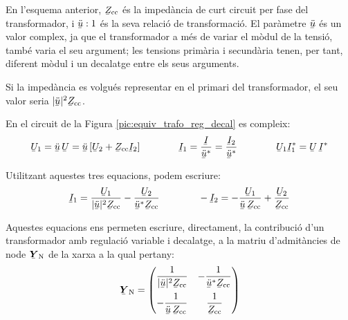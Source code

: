 En l'esquema anterior, $\cmplx{Z}\ped{cc}$ \'{e}s la imped\`{a}ncia de curt
circuit per fase del transformador, i $\cmplx{\ddot{u}} : 1$ \'{e}s la
seva relaci\'{o} de transformaci\'{o}. El par\`{a}metre $\cmplx{\ddot{u}}$ \'{e}s un
valor complex, ja que el transformador a m\'{e}s de variar el m\`{o}dul de
la tensi\'{o}, tamb\'{e} varia  el seu argument; les tensions prim\`{a}ria i
secund\`{a}ria tenen, per tant,  diferent m\`{o}dul i un decalatge entre els
seus arguments.

Si la imped\`{a}ncia es volgu\'{e}s representar en el primari del transformador, el seu valor
seria $|\cmplx{\ddot{u}}|^2 \cmplx{Z}\ped{cc}$.

En el circuit de la Figura \vref{pic:equiv_trafo_reg_decal} es
compleix: 
\begin{equation}
   \cmplx{U}_1 = \cmplx{\ddot{u}} \,\cmplx{U} = \cmplx{\ddot{u}}\,
   [\cmplx{U}_2+\cmplx{Z}\ped{cc}\cmplx{I}_2]
   \qquad\qquad
   \cmplx{I}_1 = \frac{\cmplx{I}}{\cmplx{\ddot{u}}^*} = \frac{\cmplx{I}_2}{\cmplx{\ddot{u}}^*}
   \qquad\qquad
   \cmplx{U}_1 \cmplx{I}_1^* = \cmplx{U} \,\cmplx{I}^*
\end{equation}

Utilitzant aquestes tres equacions, podem escriure:
\begin{equation}
   \cmplx{I}_1 = \frac{\cmplx{U}_1}{|\cmplx{\ddot{u}}|^2 \cmplx{Z}\ped{cc}} - \frac{\cmplx{U}_2}
   {\cmplx{\ddot{u}}^* \cmplx{Z}\ped{cc}} \qquad\qquad
   - \cmplx{I}_2 = - \frac{\cmplx{U}_1}{\cmplx{\ddot{u}} \,\cmplx{Z}\ped{cc}} + \frac{\cmplx{U}_2}
   {\cmplx{Z}\ped{cc}}
\end{equation}

Aquestes equacions ens permeten escriure, directament, la
contribuci\'{o} d'un transformador amb regulaci\'{o} variable i decalatge, a
la matriu d'admit\`{a}ncies de node $\mcmplx{Y}\ped{N}$ de la xarxa a la
qual pertany: 
\begin{equation} \label{eq:yn_trafo_reg_decal}
   \mcmplx{Y}\ped{N} = \begin{pmatrix}
     \dfrac{1}{|\cmplx{\ddot{u}}|^2 \cmplx{Z}\ped{cc}} & - \dfrac{1}
   {\cmplx{\ddot{u}}^* \cmplx{Z}\ped{cc}} \\[2.5ex]
     - \dfrac{1}{\cmplx{\ddot{u}} \,\cmplx{Z}\ped{cc}} & \dfrac{1}
   {\cmplx{Z}\ped{cc}}
   \end{pmatrix}
\end{equation}

